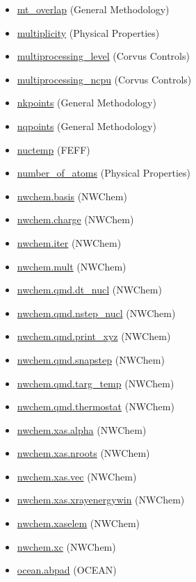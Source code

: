 \documentclass[11pt]{article}
\begin{document}
\begin{itemize}
\item \hyperref[kw:mt-overlap]{mt\_overlap} (General Methodology)
\item \hyperref[kw:multiplicity]{multiplicity} (Physical Properties)
\item \hyperref[kw:multiprocessing-level]{multiprocessing\_level} (Corvus Controls)
\item \hyperref[kw:multiprocessing-ncpu]{multiprocessing\_ncpu} (Corvus Controls)
\item \hyperref[kw:nkpoints]{nkpoints} (General Methodology)
\item \hyperref[kw:nqpoints]{nqpoints} (General Methodology)
\item \hyperref[kw:nuctemp]{nuctemp} (FEFF)
\item \hyperref[kw:number-of-atoms]{number\_of\_atoms} (Physical Properties)
\item \hyperref[kw:nwchem-basis]{nwchem.basis} (NWChem)
\item \hyperref[kw:nwchem-charge]{nwchem.charge} (NWChem)
\item \hyperref[kw:nwchem-iter]{nwchem.iter} (NWChem)
\item \hyperref[kw:nwchem-mult]{nwchem.mult} (NWChem)
\item \hyperref[kw:nwchem-qmd-dt-nucl]{nwchem.qmd.dt\_nucl} (NWChem)
\item \hyperref[kw:nwchem-qmd-nstep-nucl]{nwchem.qmd.nstep\_nucl} (NWChem)
\item \hyperref[kw:nwchem-qmd-print-xyz]{nwchem.qmd.print\_xyz} (NWChem)
\item \hyperref[kw:nwchem-qmd-snapstep]{nwchem.qmd.snapstep} (NWChem)
\item \hyperref[kw:nwchem-qmd-targ-temp]{nwchem.qmd.targ\_temp} (NWChem)
\item \hyperref[kw:nwchem-qmd-thermostat]{nwchem.qmd.thermostat} (NWChem)
\item \hyperref[kw:nwchem-xas-alpha]{nwchem.xas.alpha} (NWChem)
\item \hyperref[kw:nwchem-xas-nroots]{nwchem.xas.nroots} (NWChem)
\item \hyperref[kw:nwchem-xas-vec]{nwchem.xas.vec} (NWChem)
\item \hyperref[kw:nwchem-xas-xrayenergywin]{nwchem.xas.xrayenergywin} (NWChem)
\item \hyperref[kw:nwchem-xaselem]{nwchem.xaselem} (NWChem)
\item \hyperref[kw:nwchem-xc]{nwchem.xc} (NWChem)
\item \hyperref[kw:ocean-abpad]{ocean.abpad} (OCEAN)

\end{itemize}
\end{document}
